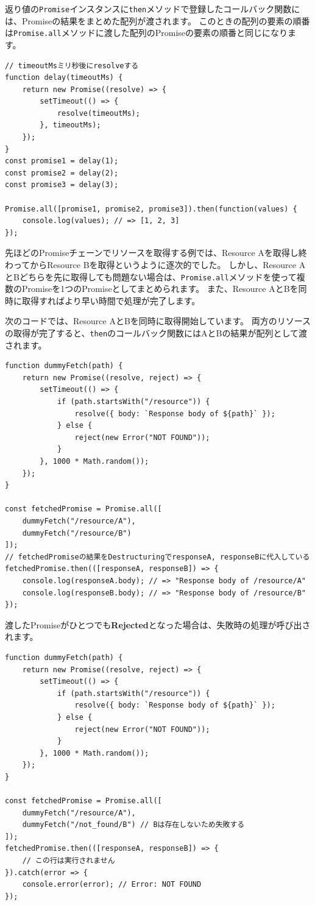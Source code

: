 返り値の\texttt{Promise}インスタンスに\texttt{then}メソッドで登録したコールバック関数には、Promiseの結果をまとめた配列が渡されます。
このときの配列の要素の順番は\texttt{Promise.all}メソッドに渡した配列のPromiseの要素の順番と同じになります。

\begin{lstlisting}
// timeoutMsミリ秒後にresolveする
function delay(timeoutMs) {
    return new Promise((resolve) => {
        setTimeout(() => {
            resolve(timeoutMs);
        }, timeoutMs);
    });
}
const promise1 = delay(1);
const promise2 = delay(2);
const promise3 = delay(3);

Promise.all([promise1, promise2, promise3]).then(function(values) {
    console.log(values); // => [1, 2, 3]
});
\end{lstlisting}

先ほどのPromiseチェーンでリソースを取得する例では、Resource
Aを取得し終わってからResource Bを取得というように逐次的でした。
しかし、Resource
AとBどちらを先に取得しても問題ない場合は、\texttt{Promise.all}メソッドを使って複数のPromiseを1つのPromiseとしてまとめられます。
また、Resource AとBを同時に取得すればより早い時間で処理が完了します。

次のコードでは、Resource AとBを同時に取得開始しています。
両方のリソースの取得が完了すると、\texttt{then}のコールバック関数にはAとBの結果が配列として渡されます。

\begin{lstlisting}
function dummyFetch(path) {
    return new Promise((resolve, reject) => {
        setTimeout(() => {
            if (path.startsWith("/resource")) {
                resolve({ body: `Response body of ${path}` });
            } else {
                reject(new Error("NOT FOUND"));
            }
        }, 1000 * Math.random());
    });
}

const fetchedPromise = Promise.all([
    dummyFetch("/resource/A"),
    dummyFetch("/resource/B")
]);
// fetchedPromiseの結果をDestructuringでresponseA, responseBに代入している
fetchedPromise.then(([responseA, responseB]) => {
    console.log(responseA.body); // => "Response body of /resource/A"
    console.log(responseB.body); // => "Response body of /resource/B"
});
\end{lstlisting}

渡したPromiseがひとつでも\textbf{Rejected}となった場合は、失敗時の処理が呼び出されます。

\begin{lstlisting}
function dummyFetch(path) {
    return new Promise((resolve, reject) => {
        setTimeout(() => {
            if (path.startsWith("/resource")) {
                resolve({ body: `Response body of ${path}` });
            } else {
                reject(new Error("NOT FOUND"));
            }
        }, 1000 * Math.random());
    });
}

const fetchedPromise = Promise.all([
    dummyFetch("/resource/A"),
    dummyFetch("/not_found/B") // Bは存在しないため失敗する
]);
fetchedPromise.then(([responseA, responseB]) => {
    // この行は実行されません
}).catch(error => {
    console.error(error); // Error: NOT FOUND
});
\end{lstlisting}

